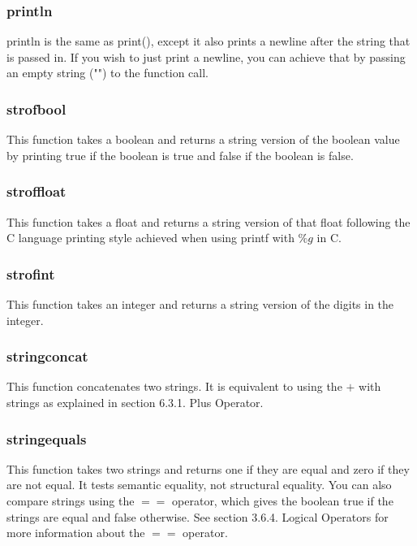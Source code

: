 \documentclass[12pt]{article}
\begin{document}
\subsubsection{println}
println is the same as print(), except it also prints a newline after the string that is passed in. If you wish to just print a newline, you can achieve that by passing an empty string ("") to the function call. \\

\subsubsection{str\textunderscore of\textunderscore bool}
This function takes a boolean and returns a string version of the boolean value by printing true if the boolean is true and false if the boolean is false.

\subsubsection{str\textunderscore of\textunderscore float}
This function takes a float and returns a string version of that float following the C language printing style achieved when using printf with $\%g$ in C.

\subsubsection{str\textunderscore of\textunderscore int}
This function takes an integer and returns a string version of the digits in the integer.

\subsubsection{string\textunderscore concat}
This function concatenates two strings. It is equivalent to using the $+$ with strings as explained in section 6.3.1. Plus Operator.

\subsubsection{string\textunderscore equals}
This function takes two strings and returns one if they are equal and zero if they are not equal. It tests semantic equality, not structural equality. You can also compare strings using the $==$ operator, which gives the boolean true if the strings are equal and false otherwise. See section 3.6.4. Logical Operators for more information about the $==$ operator.
\end{document}
